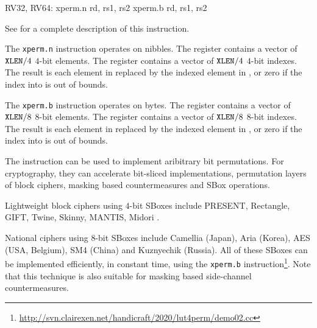 \begin{cryptobitmanipisa}
RV32, RV64:
    xperm.n rd, rs1, rs2
    xperm.b rd, rs1, rs2
\end{cryptobitmanipisa}

See \cite[Section 2.2.4]{riscv:bitmanip:draft} for a complete
description of this instruction.

The {\tt xperm.n} instruction operates on nibbles.
The \rsone register contains a vector of ${\tt XLEN}/4$ $4$-bit elements.
The \rstwo register contains a vector of ${\tt XLEN}/4$ $4$-bit indexes.
The result is each element in \rstwo replaced by the indexed element
in \rsone, or zero if the index into \rstwo is out of bounds.

The {\tt xperm.b} instruction operates on bytes.
The \rsone register contains a vector of ${\tt XLEN}/8$ $8$-bit elements.
The \rstwo register contains a vector of ${\tt XLEN}/8$ $8$-bit indexes.
The result is each element in \rstwo replaced by the indexed element
in \rsone, or zero if the index into \rstwo is out of bounds.

The instruction can be used to implement aribitrary bit
permutations.
For cryptography, they can accelerate bit-sliced implementations,
permutation layers of block ciphers, masking based countermeasures
and SBox operations.

Lightweight block ciphers using $4$-bit SBoxes include
PRESENT\cite{block:present},
Rectangle\cite{block:rectangle},
GIFT\cite{block:gift},
Twine\cite{block:twine},
Skinny, MANTIS\cite{block:skinny},
Midori \cite{block:midori}.

National ciphers using $8$-bit SBoxes include
Camellia\cite{block:camellia} (Japan), 
Aria\cite{block:aria} (Korea),
AES\cite{nist:fips:197} (USA, Belgium),
SM4\cite{block:sm4:1} (China)
and Kuznyechik (Russia).
All of these SBoxes can be implemented efficiently, in constant
time, using the {\tt xperm.b} instruction\footnote{
    \url{http://svn.clairexen.net/handicraft/2020/lut4perm/demo02.cc}
}.
Note that this technique is also suitable for masking based
side-channel countermeasures.

%
